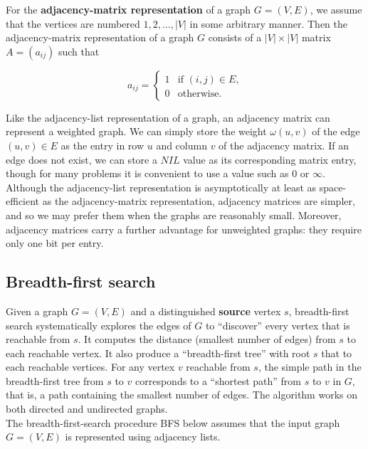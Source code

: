 \documentclass[12pt]{article}
\begin{document}
For the \textbf{adjacency-matrix representation} of a graph $G = (V,E)$, we assume that the vertices are numbered $1,2,\dots,|V|$ in some arbitrary manner. Then the adjacency-matrix representation of a graph $G$ consists of a $|V| \times |V|$ matrix $A = (a_{ij})$ such that

\begin{equation*}
  a_{ij} =
  \begin{cases}
    1 & \text{if $(i,j) \in E$,} \\
    0 & \text{otherwise.}
  \end{cases}
\end{equation*}

Like the adjacency-list representation of a graph, an adjacency matrix can represent a weighted graph. We can simply store the weight $\omega(u,v)$ of the edge $(u,v) \in E$ as the entry in row $u$ and column $v$ of the adjacency matrix. If an edge does not exist, we can store a $NIL$ value as its corresponding matrix entry, though for many problems it is convenient to use a value such as $0$ or $\infty$. \\

Although the adjacency-list representation is asymptotically at least as space-efficient as the adjacency-matrix representation, adjacency matrices are simpler, and so we may prefer them when the graphs are reasonably small. Moreover, adjacency matrices carry a further advantage for unweighted graphs: they require only one bit per entry.

\subsection{Breadth-first search}

Given a graph $G = (V,E)$ and a distinguished \textbf{source} vertex $s$, breadth-first search systematically explores the edges of $G$ to ``discover'' every vertex that is reachable from $s$. It computes the distance (smallest number of edges) from $s$ to each reachable vertex. It also produce a ``breadth-first tree'' with root $s$ that to each reachable vertices. For any vertex $v$ reachable from $s$, the simple path in the breadth-first tree from $s$ to $v$ corresponds to a ``shortest path'' from $s$ to $v$ in $G$, that is, a path containing the smallest number of edges. The algorithm works on both directed and undirected graphs. \\

The breadth-first-search procedure BFS below assumes that the input graph $G = (V,E)$ is represented using adjacency lists. \\
\end{document}

